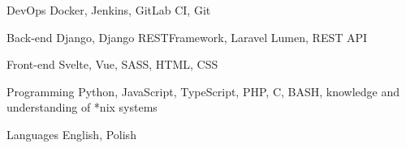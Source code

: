 

\begin{cvskills}

  \cvskill
    {DevOps} %
    {Docker, Jenkins, GitLab CI, Git} %

  \cvskill
    {Back-end} %
    {Django, Django RESTFramework, Laravel Lumen, REST API} %

  \cvskill
    {Front-end} %
    {Svelte, Vue, SASS, HTML, CSS} %

  \cvskill
    {Programming} %
    {Python, JavaScript, TypeScript, PHP, C, BASH, knowledge and understanding of *nix systems} %

  \cvskill
    {Languages} %
    {English, Polish} %

\end{cvskills}
